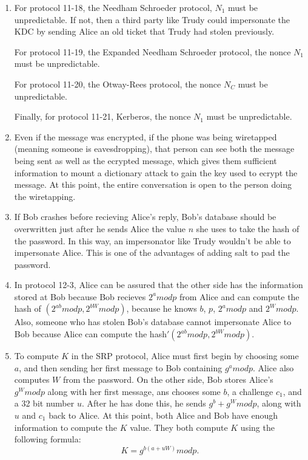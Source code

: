 \documentclass[11pt]{article}
\begin{document}
\begin{enumerate}
\item 

For protocol 11-18, the Needham Schroeder protocol, $N_1$ must be unpredictable.  If not, then a third party like Trudy could impersonate the KDC by sending Alice an old ticket that Trudy had stolen previously.  

For protocol 11-19, the Expanded Needham Schroeder protocol, the nonce $N_1$ must be unpredictable.  

For protocol 11-20, the Otway-Rees protocol, the nonce $N_C$ must be unpredictable.  

Finally, for protocol 11-21, Kerberos, the nonce $N_1$ must be unpredictable.  

\item 

Even if the message was encrypted, if the phone was being wiretapped (meaning someone is eavesdropping), that person can see both the message being sent as well as the ecrypted message, which gives them sufficient information to mount a dictionary attack to gain the key used to ecrypt the message.  At this point, the entire conversation is open to the person doing the wiretapping.  

\item 

If Bob crashes before recieving Alice's reply, Bob's database should be overwritten just after he sends Alice the value $n$ she uses to take the hash of the password.  In this way, an impersonator like Trudy wouldn't be able to impersonate Alice.  This is one of the advantages of adding salt to pad the password.  

\item 

In protocol 12-3, Alice can be assured that the other side has the information stored at Bob because Bob recieves $2^a mod p$ from Alice and can compute the hash of $(2^{ab}mod p, 2^{bW}mod p)$, because he knows $b$, $p$, $2^a mod p$ and $2^W mod p$.  Also, someone who has stolen Bob's database cannot impersonate Alice to Bob because Alice can compute the hash$'(2^{ab} mod p, 2^{bW} mod p)$.  

\item 

To compute $K$ in the SRP protocol, Alice must first begin by choosing some $a$, and then sending her first message to Bob containing $g^a mod p$.  Alice also computes $W$ from the password.  On the other side, Bob stores Alice's $g^W mod p$ along with her first message, ans chooses some $b$, a challenge $c_1$, and a 32 bit number $u$.  After he has done this, he sends $g^b + g^W mod p$, along with $u$ and $c_1$ back to Alice.  At this point, both Alice and Bob have enough information to compute the $K$ value.  They both compute $K$ using the following formula:
$$ K = g^{b(a+uW)} mod p. $$


\end{enumerate}
\end{document}
